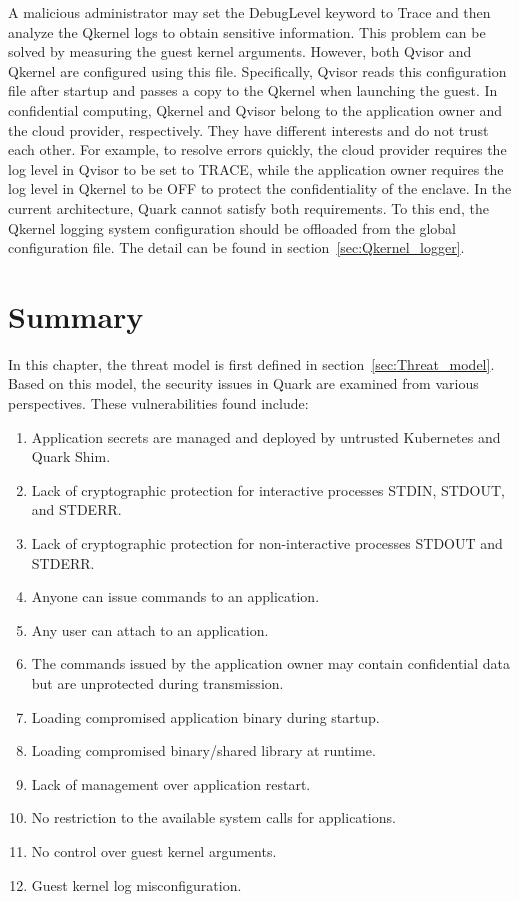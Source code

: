 A malicious administrator may set the DebugLevel keyword to Trace and then analyze the Qkernel logs to obtain sensitive information. This problem can be solved by measuring the guest kernel arguments. However, both Qvisor and Qkernel are configured using this file. Specifically, Qvisor reads this configuration file after startup and passes a copy to the Qkernel when 
launching the guest. In confidential computing, Qkernel and Qvisor belong to the application owner and the cloud provider, respectively. They have different interests and do not trust each other. For example, to resolve errors quickly, the cloud provider requires the log level in Qvisor to be set to TRACE, while the application owner 
requires the log level in Qkernel to be OFF to protect the confidentiality of the enclave. In the current architecture, Quark cannot satisfy both requirements. To this end, the Qkernel logging system configuration should be offloaded from the global configuration 
file. The detail can be found in section~\ref{sec:Qkernel_logger}.




\section{Summary}
\label{sec:security_summarize}
In this chapter, the threat model is first defined in section~\ref{sec:Threat_model}. Based on this model, the security issues in Quark are examined from various perspectives. These vulnerabilities found include:
\begin{enumerate}
  \item \label{vulnerabilities:1} Application secrets are managed and deployed by untrusted Kubernetes and Quark Shim.
  \item \label{vulnerabilities:2} Lack of cryptographic protection for interactive processes STDIN, STDOUT, and STDERR.
  \item \label{vulnerabilities:3} Lack of cryptographic protection for non-interactive processes STDOUT and STDERR.
  \item \label{vulnerabilities:4} Anyone can issue commands to an application.
  \item \label{vulnerabilities:5} Any user can attach to an application.
  \item \label{vulnerabilities:6} The commands issued by the application owner may contain confidential data but are unprotected during transmission.
  \item \label{vulnerabilities:7} Loading compromised application binary during startup.
  \item \label{vulnerabilities:8} Loading compromised binary/shared library at runtime.
  \item \label{vulnerabilities:9}  Lack of management over application restart.
  \item \label{vulnerabilities:10} No restriction to the available system calls for applications.
  \item \label{vulnerabilities:11} No control over guest kernel arguments.
  \item \label{vulnerabilities:12} Guest kernel log misconfiguration.

\end{enumerate}

\cleardoublepage

